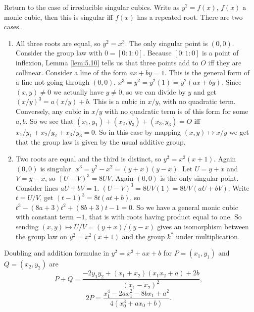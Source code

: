 \documentclass{article}
\newcommand{\rb}[1]{\left( #1 \right)}
\renewcommand{\sb}[1]{\left[ #1 \right]}
\theoremstyle{definition}\newtheorem{definition}{Definition}[section]
\theoremstyle{definition}\newtheorem{remark}[definition]{Remark}
\theoremstyle{definition}\newtheorem*{example}{Example}
\theoremstyle{definition}\newtheorem*{note}{Note}
\begin{document}
Return to the case of irreducible singular cubics. Write as $ y^2 = f\rb{x} $, $ f\rb{x} $ a monic cubic, then this is singular iff $ f\rb{x} $ has a repeated root. There are two cases.
\begin{enumerate}
\item All three roots are equal, so $ y^2 = x^3 $. The only singular point is $ \rb{0, 0} $. Consider the group law with $ 0 = \sb{0 : 1 : 0} $. Because $ \sb{0 : 1 : 0} $ is a point of inflexion, Lemma \ref{lem:5.10} tells us that three points add to $ O $ iff they are collinear. Consider a line of the form $ ax + by = 1 $. This is the general form of a line not going through $ \rb{0, 0} $. $ x^3 = y^2 = y^2\rb{1} = y^2\rb{ax + by} $. Since $ \rb{x, y} \ne 0 $ we actually have $ y \ne 0 $, so we can divide by $ y $ and get $ \rb{x / y}^3 = a\rb{x / y} + b $. This is a cubic in $ x / y $, with no quadratic term. Conversely, any cubic in $ x / y $ with no quadratic term is of this form for some $ a, b $. So we see that $ \rb{x_1, y_1} + \rb{x_2, y_3} + \rb{x_3, y_3} = O $ iff $ x_1 / y_1 + x_2 / y_2 + x_3 / y_3 = 0 $. So in this case by mapping $ \rb{x, y} \mapsto x / y $ we get that the group law is given by the usual additive group.
\item Two roots are equal and the third is distinct, so $ y^2 = x^2\rb{x + 1} $. Again $ \rb{0, 0} $ is singular. $ x^3 = y^2 - x^2 = \rb{y + x}\rb{y - x} $. Let $ U = y + x $ and $ V = y - x $, so $ \rb{U - V}^3 = 8UV $. Again $ \rb{0, 0} $ is the only singular point. Consider lines $ aU + bV = 1 $. $ \rb{U - V}^3 = 8UV\rb{1} = 8UV\rb{aU + bV} $. Write $ t = U / V $, get $ \rb{t - 1}^3 = 8t\rb{at + b} $, so $ t^3 - \rb{8a + 3}t^2 + \rb{8b + 3}t - 1 = 0 $. So we have a general monic cubic with constant term $ -1 $, that is with roots having product equal to one. So sending $ \rb{x, y} \mapsto U / V = \rb{y + x} / \rb{y - x} $ gives an isomorphism between the group law on $ y^2 = x^2\rb{x + 1} $ and the group $ k^* $ under multiplication.
\end{enumerate}


Doubling and addition formulae in $ y^2 = x^3 + ax + b $ for $ P = \rb{x_1, y_1} $ and $ Q = \rb{x_2, y_2} $ are
$$ P + Q = \dfrac{-2y_1y_2 + \rb{x_1 + x_2}\rb{x_1x_2 + a} + 2b}{\rb{x_1 - x_2}^2}, $$
$$ 2P = \dfrac{x_1^4 - 2ax_1^2 - 8bx_1 + a^2}{4\rb{x_0^3 + ax_0 + b}}. $$
\end{document}
